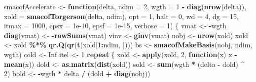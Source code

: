 \documentclass[
  12pt,
]{article}
\newenvironment{Shaded}{\begin{snugshade}}{\end{snugshade}}
\newcommand{\AttributeTok}[1]{\textcolor[rgb]{0.13,0.29,0.53}{#1}}
\newcommand{\ConstantTok}[1]{\textcolor[rgb]{0.56,0.35,0.01}{#1}}
\newcommand{\ControlFlowTok}[1]{\textcolor[rgb]{0.13,0.29,0.53}{\textbf{#1}}}
\newcommand{\DecValTok}[1]{\textcolor[rgb]{0.00,0.00,0.81}{#1}}
\newcommand{\FloatTok}[1]{\textcolor[rgb]{0.00,0.00,0.81}{#1}}
\newcommand{\FunctionTok}[1]{\textcolor[rgb]{0.13,0.29,0.53}{\textbf{#1}}}
\newcommand{\NormalTok}[1]{#1}
\newcommand{\OtherTok}[1]{\textcolor[rgb]{0.56,0.35,0.01}{#1}}
\newcommand{\SpecialCharTok}[1]{\textcolor[rgb]{0.81,0.36,0.00}{\textbf{#1}}}
\begin{document}
\begin{Shaded}
\begin{Highlighting}[]
\NormalTok{smacofAccelerate }\OtherTok{\textless{}{-}} \ControlFlowTok{function}\NormalTok{(delta,}
                             \AttributeTok{ndim =} \DecValTok{2}\NormalTok{,}
                             \AttributeTok{wgth =} \DecValTok{1} \SpecialCharTok{{-}} \FunctionTok{diag}\NormalTok{(}\FunctionTok{nrow}\NormalTok{(delta)),}
                             \AttributeTok{xold =} \FunctionTok{smacofTorgerson}\NormalTok{(delta, ndim),}
                             \AttributeTok{opt =} \DecValTok{1}\NormalTok{,}
                             \AttributeTok{halt =} \DecValTok{0}\NormalTok{,}
                             \AttributeTok{wd =} \DecValTok{4}\NormalTok{,}
                             \AttributeTok{dg =} \DecValTok{15}\NormalTok{,}
                             \AttributeTok{itmax =} \DecValTok{1000}\NormalTok{,}
                             \AttributeTok{epsx =} \FloatTok{1e{-}10}\NormalTok{,}
                             \AttributeTok{epsf =} \FloatTok{1e{-}15}\NormalTok{,}
                             \AttributeTok{verbose =} \DecValTok{1}\NormalTok{) \{}
\NormalTok{  vmat }\OtherTok{\textless{}{-}} \SpecialCharTok{{-}}\NormalTok{wgth}
  \FunctionTok{diag}\NormalTok{(vmat) }\OtherTok{\textless{}{-}} \SpecialCharTok{{-}}\FunctionTok{rowSums}\NormalTok{(vmat)}
\NormalTok{  vinv }\OtherTok{\textless{}{-}} \FunctionTok{ginv}\NormalTok{(vmat)}
\NormalTok{  nobj }\OtherTok{\textless{}{-}} \FunctionTok{nrow}\NormalTok{(xold)}
\NormalTok{  xold }\OtherTok{\textless{}{-}}\NormalTok{ xold }\SpecialCharTok{\%*\%} \FunctionTok{qr.Q}\NormalTok{(}\FunctionTok{qr}\NormalTok{(}\FunctionTok{t}\NormalTok{(xold[}\DecValTok{1}\SpecialCharTok{:}\NormalTok{ndim, ])))}
\NormalTok{  bs }\OtherTok{\textless{}{-}} \FunctionTok{smacofMakeBasis}\NormalTok{(nobj, ndim, wgth)}
\NormalTok{  cold }\OtherTok{\textless{}{-}} \ConstantTok{Inf}
\NormalTok{  itel }\OtherTok{\textless{}{-}} \DecValTok{1}
  \ControlFlowTok{repeat}\NormalTok{ \{}
\NormalTok{    xold }\OtherTok{\textless{}{-}} \FunctionTok{apply}\NormalTok{(xold, }\DecValTok{2}\NormalTok{, }\ControlFlowTok{function}\NormalTok{(x)}
\NormalTok{      x }\SpecialCharTok{{-}} \FunctionTok{mean}\NormalTok{(x))}
\NormalTok{    dold }\OtherTok{\textless{}{-}} \FunctionTok{as.matrix}\NormalTok{(}\FunctionTok{dist}\NormalTok{(xold))}
\NormalTok{    sold }\OtherTok{\textless{}{-}} \FunctionTok{sum}\NormalTok{(wgth }\SpecialCharTok{*}\NormalTok{ (delta }\SpecialCharTok{{-}}\NormalTok{ dold) }\SpecialCharTok{\^{}} \DecValTok{2}\NormalTok{)}
\NormalTok{    bold }\OtherTok{\textless{}{-}} \SpecialCharTok{{-}}\NormalTok{wgth }\SpecialCharTok{*}\NormalTok{ delta }\SpecialCharTok{/}\NormalTok{ (dold }\SpecialCharTok{+} \FunctionTok{diag}\NormalTok{(nobj))}

\end{Highlighting}
\end{Shaded}
\end{document}
